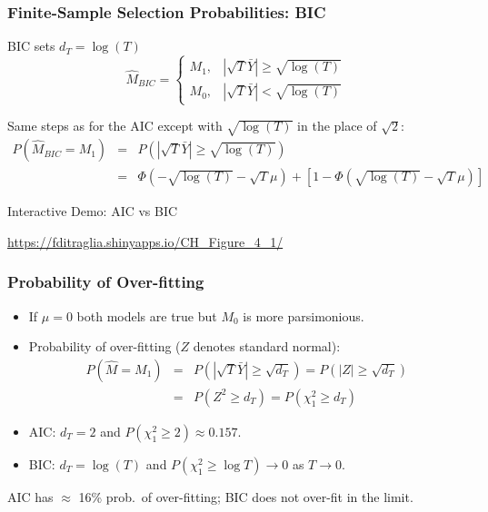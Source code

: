 \begin{frame}
  \frametitle{Finite-Sample Selection Probabilities: BIC}

  \begin{block}{BIC sets $d_T = \log(T)$}
	$$\widehat{M}_{BIC} = \left\{\begin{array}
		{cc} M_1, & |\sqrt{T}\bar{Y} | \geq \sqrt{\log(T)} \\
		M_0, & |\sqrt{T} \bar{Y}| < \sqrt{\log(T)}
	\end{array} \right.$$
  \end{block}
Same steps as for the AIC except with $\sqrt{\log(T)}$ in the place of $\sqrt{2}$:
\footnotesize
	\begin{eqnarray*}
		P\left(\widehat{M}_{BIC} = M_1\right) &=& P\left(\left|\sqrt{T}\bar{Y} \right| \geq \sqrt{\log(T)}  \right)\\
			&=& \Phi\left(-\sqrt{\log(T)} - \sqrt{T}\mu\right) + \left[1 -  \Phi\left(\sqrt{\log(T)} - \sqrt{T} \mu \right)\right]
	\end{eqnarray*}

  \begin{block}{Interactive Demo: AIC vs BIC}

\url{https://fditraglia.shinyapps.io/CH\_Figure\_4\_1/}
  \end{block}
\end{frame}
\begin{frame}
  \frametitle{Probability of Over-fitting}

  \small

  \begin{itemize}
    \item If $\mu = 0$ both models are true but $M_0$ is more parsimonious. 
    \item Probability of over-fitting ($Z$ denotes standard normal): 
\begin{eqnarray*}
	P\left(\widehat{M} = M_1\right) &=& P\left(|\sqrt{T}\bar{Y}|\geq \sqrt{d_T}\right) = P(|Z|\geq \sqrt{d_T})\\
	 &=& P(Z^2 \geq d_T) = P(\chi^2_1 \geq d_T)
\end{eqnarray*}
\item AIC: $d_T = 2$ and $P(\chi^2_1 \geq 2)\approx 0.157$.  
\item BIC: $d_T = \log(T)$ and $P(\chi^2_1 \geq \log T) \rightarrow 0$ as $T\rightarrow 0$.
  \end{itemize}

  \alert{AIC has $\approx$ 16\% prob.\ of over-fitting; BIC does not over-fit in the limit.}


\end{frame}

